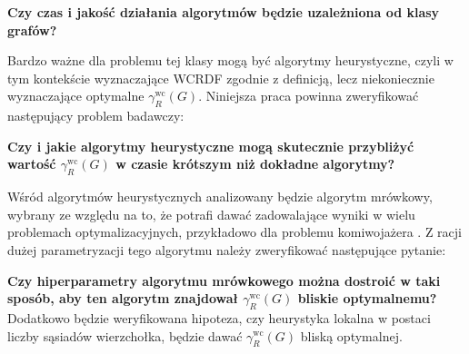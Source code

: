 \textbf{Czy czas i jakość działania algorytmów będzie uzależniona od klasy grafów?}

Bardzo ważne dla problemu tej klasy mogą być algorytmy heurystyczne, czyli w tym kontekście wyznaczające WCRDF zgodnie z definicją, lecz niekoniecznie wyznaczające optymalne $\gamma_{R}^{\text{wc}}(G)$. Niniejsza praca powinna zweryfikować następujący problem badawczy:

\textbf{Czy i jakie algorytmy heurystyczne mogą skutecznie przybliżyć wartość $\gamma_{R}^{\text{wc}}(G)$ w czasie krótszym niż dokładne algorytmy?}

Wśród algorytmów heurystycznych analizowany będzie algorytm mrówkowy, wybrany ze względu na to, że potrafi dawać zadowalające wyniki w wielu problemach optymalizacyjnych, przykładowo dla problemu komiwojażera \cite{TRAVEL}. Z racji dużej parametryzacji tego algorytmu należy zweryfikować następujące pytanie:

\textbf{Czy hiperparametry algorytmu mrówkowego można dostroić w taki sposób, aby ten algorytm znajdował $\gamma_{R}^{\text{wc}}(G)$ bliskie optymalnemu?}\\
Dodatkowo będzie weryfikowana hipoteza, czy heurystyka lokalna w postaci liczby sąsiadów wierzchołka, będzie dawać $\gamma_{R}^{\text{wc}}(G)$ bliską optymalnej.

